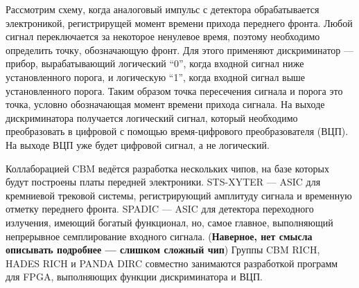 Рассмотрим схему, когда аналоговый импульс с детектора обрабатывается электроникой, регистрирущей момент времени прихода переднего фронта. Любой сигнал переключается за некоторое ненулевое время, поэтому необходимо определить точку, обозначающую фронт. Для этого применяют дискриминатор --- прибор, вырабатывающий логический ``0'', когда входной сигнал ниже установленного порога, и логическую ``1'', когда входной сигнал выше установленного порога. Таким образом точка пересечения сигнала и порога это точка, условно обозначающая момент времени прихода сигнала. На выходе дискриминатора получается логический сигнал, который необходимо преобразовать в цифровой с помощью время-цифрового преобразователя (ВЦП). На выходе ВЦП уже будет цифровой сигнал, а не логический.

Коллаборацией CBM ведётся разработка нескольких чипов, на базе которых будут построены платы передней электроники. STS-XYTER --- ASIC для кремниевой трековой системы, регистрирующий амплитуду сигнала и временную отметку переднего фронта. SPADIC --- ASIC для детектора переходного излучения, имеющий богатый функционал, но, самое главное, выполняющий непрерывное семплирование входного сигнала. (\textbf{Наверное, нет смысла описывать подробнее --- слишком сложный чип}) Группы CBM RICH, HADES RICH и PANDA DIRC совместно занимаются разработкой программ для FPGA, выполняющих функции дискриминатора и ВЦП.

